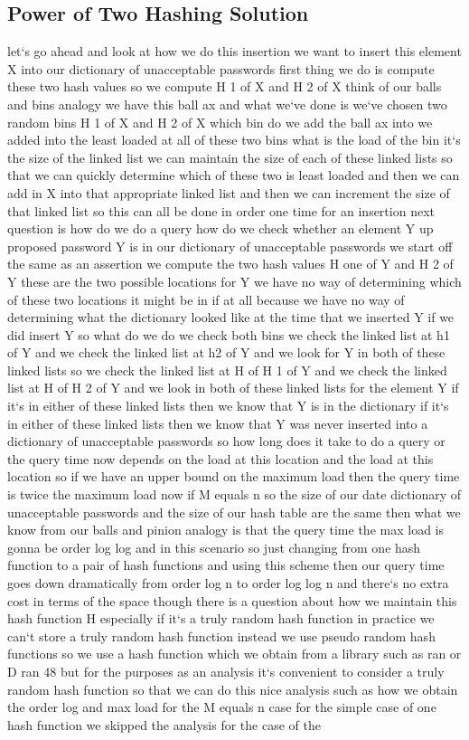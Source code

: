 \subsection{Power of Two Hashing Solution}
let`s go ahead and look at how we do this insertion we want to insert this element X into our dictionary of unacceptable passwords first thing we do is compute these two hash values so we compute H 1 of X and H 2 of X think of our balls and bins analogy we have this ball ax and what we`ve done is we`ve chosen two random bins H 1 of X and H 2 of X which bin do we add the ball ax into we added into the least loaded at all of these two bins what is the load of the bin it`s the size of the linked list we can maintain the size of each of these linked lists so that we can quickly determine which of these two is least loaded and then we can add in X into that appropriate linked list and then we can increment the size of that linked list so this can all be done in order one time for an insertion next question is how do we do a query how do we check whether an element Y up proposed password Y is in our dictionary of unacceptable passwords we start off the same as an assertion we compute the two hash values H one of Y and H 2 of Y these are the two possible locations for Y we have no way of determining which of these two locations it might be in if at all because we have no way of determining what the dictionary looked like at the time that we inserted Y if we did insert Y so what do we do we check both bins we check the linked list at h1 of Y and we check the linked list at h2 of Y and we look for Y in both of these linked lists so we check the linked list at H of H 1 of Y and we check the linked list at H of H 2 of Y and we look in both of these linked lists for the element Y if it`s in either of these linked lists then we know that Y is in the dictionary if it`s in either of these linked lists then we know that Y was never inserted into a dictionary of unacceptable passwords so how long does it take to do a query or the query time now depends on the load at this location and the load at this location so if we have an upper bound on the maximum load then the query time is twice the maximum load now if M equals n so the size of our date dictionary of unacceptable passwords and the size of our hash table are the same then what we know from our balls and pinion analogy is that the query time the max load is gonna be order log log and in this scenario so just changing from one hash function to a pair of hash functions and using this scheme then our query time goes down dramatically from order log n to order log log n and there`s no extra cost in terms of the space though there is a question about how we maintain this hash function H especially if it`s a truly random hash function in practice we can`t store a truly random hash function instead we use pseudo random hash functions so we use a hash function which we obtain from a library such as ran or D ran 48 but for the purposes as an analysis it`s convenient to consider a truly random hash function so that we can do this nice analysis such as how we obtain the order log and max load for the M equals n case for the simple case of one hash function we skipped the analysis for the case of the 